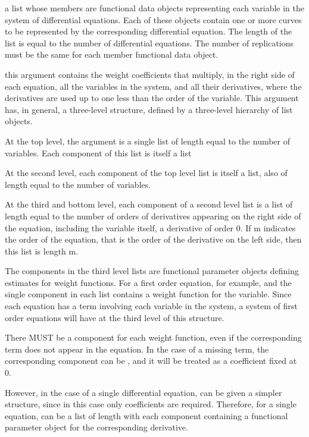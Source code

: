 \documentclass{article}
\begin{document}
\begin{Arguments}
\begin{ldescription}
\item[\code{xfdlist}] a list whose members are functional data objects representing each
variable in the system of differential equations.  Each of these objects
contain one or more curves to be represented by the corresponding differential 
equation.  The length of the list is equal to the number of 
differential equations. The number  of replications must be
the same for each member functional data object.

\item[\code{bwtlist}] this argument contains the weight coefficients that multiply, in the right
side of each equation, all the variables in the system, and all their 
derivatives, where the derivatives are used up to one less than the order
of the variable.   This argument has, in general, a three-level structure,
defined by a three-level hierarchy of list objects.  

At the top level, the argument is a single list of length equal to the number of 
variables. Each component of this list is itself a list 

At the second level, each component of the top level list is itself a list, also 
of length equal to the number of variables.  

At the third and bottom level, each component of a second level list is a list 
of length equal to the number of orders of derivatives appearing on the right       
side of the equation, including  the variable itself, a derivative of order 0. 
If m indicates the order of the equation, that is the order of the derivative
on the left side, then this list is length m.  

The components in the third level lists are functional parameter objects
defining estimates for weight functions.  For a first order equation,
for example,  and the single component in each list contains a weight 
function for the variable.  Since each equation has a term involving each
variable in the system, a system of first order equations will have 
at the third level of this structure.

There MUST be a component for each weight function, even if the corresponding  
term does not appear in the equation.  In the case of a missing term, the 
corresponding component can be , and it will be treated as a 
coefficient fixed at 0.  

However, in the case of a single differential equation,  can be
given a simpler structure, since in this case only  coefficients are
required.  Therefore, for a single equation,  can be a list
of length  with each component containing a functional parameter 
object for the corresponding derivative. 


\end{ldescription}
\end{Arguments}
\end{document}
